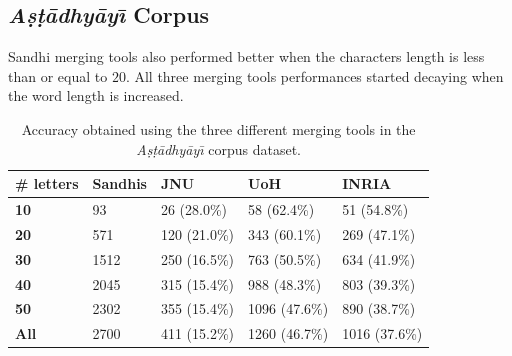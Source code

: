 \documentclass[11pt]{article}
\begin{document}
\subsection{\textit{A\d{s}\d{t}\={a}dhy\={a}y\={\i}} Corpus}
Sandhi merging tools also performed better when the characters length is less than or equal to $20$. All three merging tools performances started decaying when the word length is increased.

\begin{table}[h]
	\begin{center}
		\begin{tabular}{|p{1cm} | p{1cm}|p{1.2cm} | p{1.2cm} | p{1.2cm} |}
			\hline  
			\bf \# letters & \bf Sandhis & \bf  JNU & \bf UoH & \bf INRIA\\
			\hline
			\bf	10	&	93	&	26 (28.0\%)	&	58 (62.4\%)	&	51 (54.8\%)	\\	\hline
			\bf	20	&	571	&	120 (21.0\%)	&	343 (60.1\%)	&	269 (47.1\%)	\\	\hline
			\bf	30	&	1512	&	250 (16.5\%)	&	763 (50.5\%)	&	634 (41.9\%)	\\	\hline
			\bf	40	&	2045	&	315 (15.4\%)	&	988 (48.3\%)	&	803 (39.3\%)	\\	\hline
			\bf	50	&	2302	&	355 (15.4\%)	&	1096 (47.6\%)	&	890 (38.7\%)	\\	\hline
			\bf	All	&	2700	&	411 (15.2\%)	&	1260 (46.7\%)	&	1016 (37.6\%)	\\	\hline

		\end{tabular}
	\end{center}
	\caption{\label{ev_as_me} Accuracy obtained using the three different merging tools in the \textit{A\d{s}\d{t}\={a}dhy\={a}y\={\i}} corpus dataset.}
\end{table}


%
%
\end{document}
